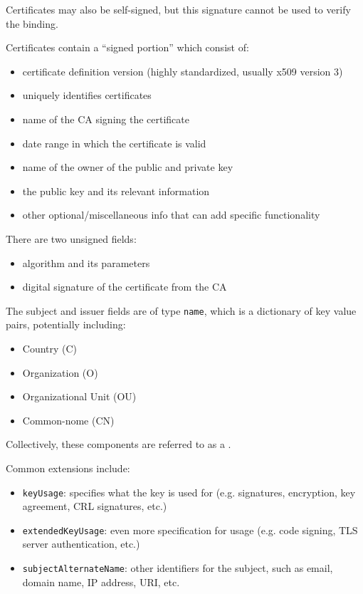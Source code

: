  Certificates may also be self-signed, but this signature cannot be used to verify the binding.

Certificates contain a ``signed portion'' which consist of:
\begin{itemize}
    \item {} certificate definition version (highly standardized, usually x509 version 3)
    \item {} uniquely identifies certificates
    \item {} name of the CA signing the certificate
    \item {} date range in which the certificate is valid
    \item {} name of the owner of the public and private key
    \item {} the public key and its relevant information
    \item {} other optional/miscellaneous info that can add specific functionality
\end{itemize}
There are two unsigned fields:
\begin{itemize}
    \item {} algorithm and its parameters
    \item {} digital signature of the certificate from the CA
\end{itemize}

The subject and issuer fields are of type \texttt{name}, which is a dictionary of key value pairs, potentially including:
\begin{itemize}[noitemsep]
    \item Country (C)
    \item Organization (O)
    \item Organizational Unit (OU)
    \item Common-nome (CN)
\end{itemize}
Collectively, these components are referred to as a .

Common extensions include:
\begin{itemize}
    \item \texttt{keyUsage}: specifies what the key is used for (e.g. signatures, encryption, key agreement, CRL signatures, etc.)
    \item \texttt{extendedKeyUsage}: even more specification for usage (e.g. code signing, TLS server authentication, etc.)
    \item \texttt{subjectAlternateName}: other identifiers for the subject, such as email, domain name, IP address, URI, etc.
\end{itemize}

